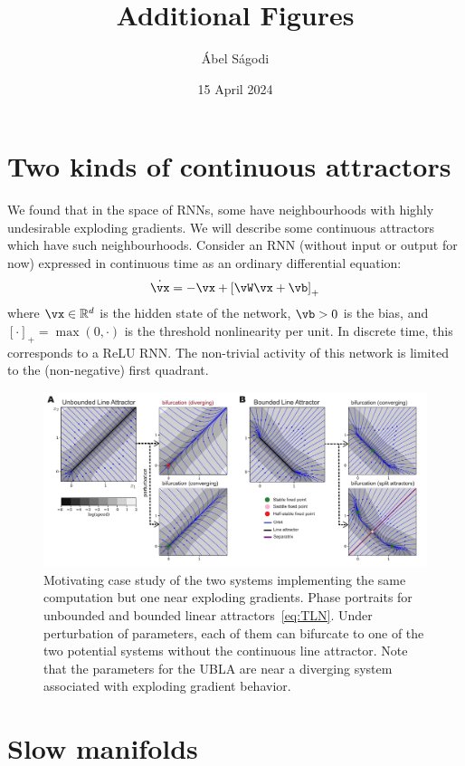 \documentclass{article}
\title{Additional Figures}
\author{\'Abel S\'agodi}
\date{15 April 2024}
\newcommand{\reals}{\mathbb{R}}
\newcounter{ct}
\theoremstyle{definition}
\theoremstyle{remark}
\begin{document}

\maketitle

\section{Two kinds of continuous attractors}
We found that in the space of RNNs, some have neighbourhoods with highly undesirable exploding gradients. We will describe some continuous attractors which have such neighbourhoods.
Consider an RNN (without input or output for now) expressed in continuous time as an ordinary differential equation:
\begin{align}\label{eq:TLN}
    \dot{\vx} = -\vx + \left[ \vW \vx + \vb \right]_{+}
\end{align}
where $\vx \in \reals^d$ is the hidden state of the network, $\vb > 0$ is the bias, and $[\cdot]_{+} = \max(0,\cdot)$ is the threshold nonlinearity per unit.
In discrete time, this corresponds to a ReLU RNN.
The non-trivial activity of this network is limited to the (non-negative) first quadrant.
\begin{figure}[tbhp]
  \centering
  \includegraphics[width=\textwidth]{UBLABLA}
  \caption{Motivating case study of the two systems implementing the same computation but one near exploding gradients.
    Phase portraits for unbounded and bounded linear attractors~\eqref{eq:TLN}.
    Under perturbation of parameters, each of them can bifurcate to one of the two potential systems without the continuous line attractor.
    Note that the parameters for the UBLA are near a diverging system associated with exploding gradient behavior.
}
  \label{fig:ublabla}
\end{figure}


\newpage
\section{Slow manifolds}
\end{document}
